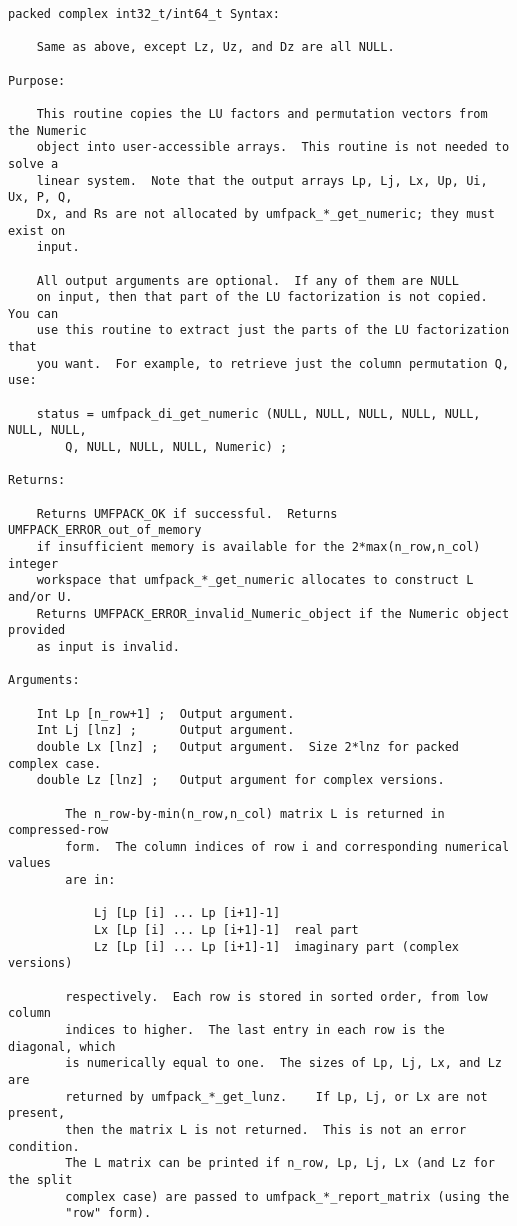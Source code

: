 \documentclass[11pt]{article}
\begin{document}
{\begin{verbatim}
packed complex int32_t/int64_t Syntax:

    Same as above, except Lz, Uz, and Dz are all NULL.

Purpose:

    This routine copies the LU factors and permutation vectors from the Numeric
    object into user-accessible arrays.  This routine is not needed to solve a
    linear system.  Note that the output arrays Lp, Lj, Lx, Up, Ui, Ux, P, Q,
    Dx, and Rs are not allocated by umfpack_*_get_numeric; they must exist on
    input.

    All output arguments are optional.  If any of them are NULL
    on input, then that part of the LU factorization is not copied.  You can
    use this routine to extract just the parts of the LU factorization that
    you want.  For example, to retrieve just the column permutation Q, use:

    status = umfpack_di_get_numeric (NULL, NULL, NULL, NULL, NULL, NULL, NULL,
        Q, NULL, NULL, NULL, Numeric) ;

Returns:

    Returns UMFPACK_OK if successful.  Returns UMFPACK_ERROR_out_of_memory
    if insufficient memory is available for the 2*max(n_row,n_col) integer
    workspace that umfpack_*_get_numeric allocates to construct L and/or U.
    Returns UMFPACK_ERROR_invalid_Numeric_object if the Numeric object provided
    as input is invalid.

Arguments:

    Int Lp [n_row+1] ;  Output argument.
    Int Lj [lnz] ;      Output argument.
    double Lx [lnz] ;   Output argument.  Size 2*lnz for packed complex case.
    double Lz [lnz] ;   Output argument for complex versions.

        The n_row-by-min(n_row,n_col) matrix L is returned in compressed-row
        form.  The column indices of row i and corresponding numerical values
        are in:

            Lj [Lp [i] ... Lp [i+1]-1]
            Lx [Lp [i] ... Lp [i+1]-1]  real part
            Lz [Lp [i] ... Lp [i+1]-1]  imaginary part (complex versions)

        respectively.  Each row is stored in sorted order, from low column
        indices to higher.  The last entry in each row is the diagonal, which
        is numerically equal to one.  The sizes of Lp, Lj, Lx, and Lz are
        returned by umfpack_*_get_lunz.    If Lp, Lj, or Lx are not present,
        then the matrix L is not returned.  This is not an error condition.
        The L matrix can be printed if n_row, Lp, Lj, Lx (and Lz for the split
        complex case) are passed to umfpack_*_report_matrix (using the
        "row" form).


\end{verbatim}}
\end{document}

